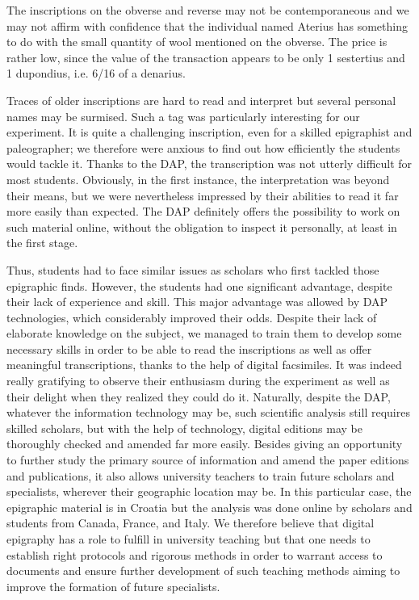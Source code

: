 \documentclass[amsthm,ebook]{saparticle}
\begin{document}
The inscriptions on the obverse and reverse may not be contemporaneous and we may not affirm with confidence that the
individual named Aterius has something to do with the small quantity of wool mentioned on the obverse. The price is
rather low, since the value of the transaction appears to be only 1 sestertius and 1 dupondius, i.e. 6/16 of a
denarius. 

Traces of older inscriptions are hard to read and interpret but several personal names may be surmised. Such a tag was
particularly interesting for our experiment. It is quite a challenging inscription, even for a skilled epigraphist and
paleographer; we therefore were anxious to find out how efficiently the students would tackle it. Thanks to the DAP,
the transcription was not utterly difficult for most students. Obviously, in the first instance, the interpretation was
beyond their means, but we were nevertheless impressed by their abilities to read it far more easily than expected. The
DAP definitely offers the possibility to work on such material online, without the obligation to inspect it personally,
at least in the first stage.

Thus, students had to face similar issues as scholars who first tackled those epigraphic finds. However, the students
had one significant advantage, despite their lack of experience and skill. This major advantage was allowed by DAP
technologies, which considerably improved their odds. Despite their lack of elaborate knowledge on the subject, we
managed to train them to develop some necessary skills in order to be able to read the inscriptions as well as offer
meaningful transcriptions, thanks to the help of digital facsimiles. It was indeed really gratifying to observe their
enthusiasm during the experiment as well as their delight when they realized they could do it. Naturally, despite the
DAP, whatever the information technology may be, such scientific analysis still requires skilled scholars, but with the
help of technology, digital editions may be thoroughly checked and amended far more easily. Besides giving an
opportunity to further study the primary source of information and amend the paper editions and publications, it also
allows university teachers to train future scholars and specialists, wherever their geographic location may be. In this
particular case, the epigraphic material is in Croatia but the analysis was done online by scholars and students from
Canada, France, and Italy. We therefore believe that digital epigraphy has a role to fulfill in university teaching but
that one needs to establish right protocols and rigorous methods in order to warrant access to documents and ensure
further development of such teaching methods aiming to improve the formation of future specialists.
\end{document}
